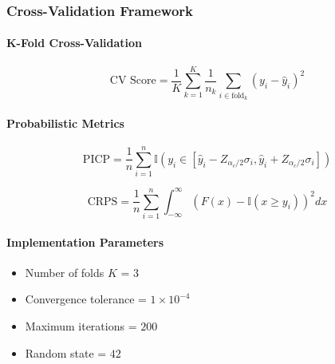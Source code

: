 \subsubsection{Cross-Validation Framework}

\paragraph{K-Fold Cross-Validation}
\[
\text{CV Score} = \frac{1}{K}\sum_{k=1}^K \frac{1}{n_k}\sum_{i \in \text{fold}_k} (y_i - \hat{y}_i)^2 
\]

\paragraph{Probabilistic Metrics}
\[
\text{PICP} = \frac{1}{n}\sum_{i=1}^n \mathbb{I}(y_i \in [\hat{y}_i - Z_{\alpha_c/2}\sigma_i, \hat{y}_i + Z_{\alpha_c/2}\sigma_i])
\]

\[
\text{CRPS} = \frac{1}{n}\sum_{i=1}^n \int_{-\infty}^{\infty} (F(x) - \mathbb{I}(x \ge y_i))^2 dx
\]

\paragraph{Implementation Parameters}
\begin{itemize}
\item Number of folds $K$ = $3$
\item Convergence tolerance = $1 \times 10^{-4}$
\item Maximum iterations = $200$
\item Random state = $42$
\end{itemize}

